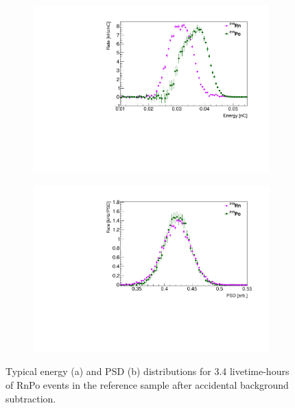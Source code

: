 \begin{figure}[!t]
	\centering
	\begin{subfigure}{0.5\linewidth}
		\centering
		\includegraphics[width=1.\linewidth]{"tex/6-ac227-images/BNL/RnPoEn_TimeBin23_S2"}
		\caption{}
	\end{subfigure}%
	\begin{subfigure}{0.5\linewidth}
		\centering
		\includegraphics[width=1.\linewidth]{"tex/6-ac227-images/BNL/RnPoPSD_TimeBin23_S2"}
		\caption{}
	\end{subfigure}
	\caption[Typical RnPo energy and PSD distributions]{Typical energy (a) and PSD (b) distributions for 3.4 livetime-hours of RnPo events in the reference sample after accidental background subtraction.}
	\label{fig:rnpoenpsd}
\end{figure}


